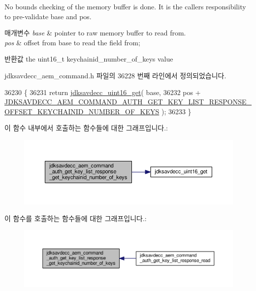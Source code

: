 No bounds checking of the memory buffer is done. It is the caller\textquotesingle{}s responsibility to pre-\/validate base and pos.


\begin{DoxyParams}{매개변수}
{\em base} & pointer to raw memory buffer to read from. \\
\hline
{\em pos} & offset from base to read the field from; \\
\hline
\end{DoxyParams}
\begin{DoxyReturn}{반환값}
the uint16\+\_\+t keychainid\+\_\+number\+\_\+of\+\_\+keys value 
\end{DoxyReturn}


jdksavdecc\+\_\+aem\+\_\+command.\+h 파일의 36228 번째 라인에서 정의되었습니다.


\begin{DoxyCode}
36230 \{
36231     \textcolor{keywordflow}{return} \hyperlink{group__endian_ga3fbbbc20be954aa61e039872965b0dc9}{jdksavdecc\_uint16\_get}( base,
36232                                   pos + 
      \hyperlink{group__command__auth__get__key__list__response_gaf5f3cf80a543f78501b936e03abcec0f}{JDKSAVDECC\_AEM\_COMMAND\_AUTH\_GET\_KEY\_LIST\_RESPONSE\_OFFSET\_KEYCHAINID\_NUMBER\_OF\_KEYS}
       );
36233 \}
\end{DoxyCode}


이 함수 내부에서 호출하는 함수들에 대한 그래프입니다.\+:
\nopagebreak
\begin{figure}[H]
\begin{center}
\leavevmode
\includegraphics[width=350pt]{group__command__auth__get__key__list__response_ga80e17c2dcbea2fad22b32a2b3a1098c1_cgraph}
\end{center}
\end{figure}




이 함수를 호출하는 함수들에 대한 그래프입니다.\+:
\nopagebreak
\begin{figure}[H]
\begin{center}
\leavevmode
\includegraphics[width=350pt]{group__command__auth__get__key__list__response_ga80e17c2dcbea2fad22b32a2b3a1098c1_icgraph}
\end{center}
\end{figure}


